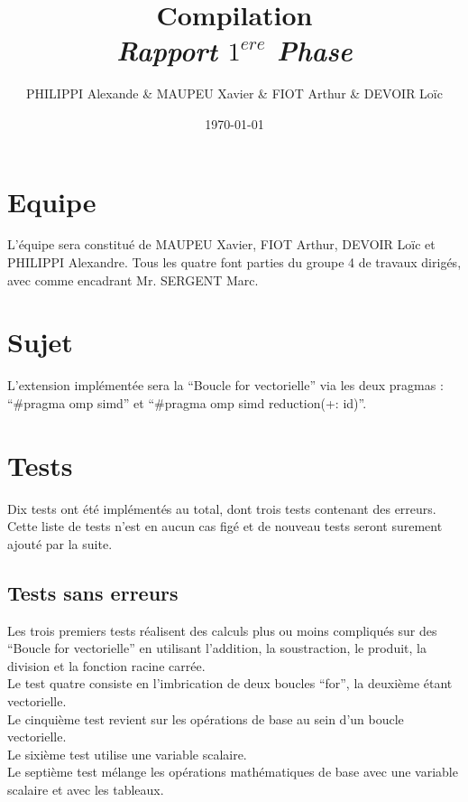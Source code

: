 \documentclass[a4paper,8pt,french,fleqn]{report}
\title{\textbf{Compilation}\\\textit{Rapport $1^{ere}$ Phase}}
\author{PHILIPPI Alexande \& MAUPEU Xavier \& FIOT Arthur \& DEVOIR Loïc}
\date{\today}
\begin{document}
\maketitle

\newpage

\section*{Equipe}

L'équipe sera constitué de MAUPEU Xavier, FIOT Arthur, DEVOIR Loïc et PHILIPPI Alexandre. Tous les quatre font parties du groupe 4 de travaux dirigés, avec comme encadrant Mr. SERGENT Marc.

\section*{Sujet}

L'extension implémentée sera la ``Boucle for vectorielle'' via les deux pragmas : ``\#pragma omp simd'' et ``\#pragma omp simd reduction(+: id)''.

\section*{Tests}

Dix tests ont été implémentés au total, dont trois tests contenant des erreurs. Cette liste de tests n'est en aucun cas figé et de nouveau tests seront surement ajouté par la suite.

\subsection*{Tests sans erreurs}

Les trois premiers tests réalisent des calculs plus ou moins compliqués sur des ``Boucle for vectorielle'' en utilisant l'addition, la soustraction, le produit, la division et la fonction racine carrée. \\

Le test quatre consiste en l'imbrication de deux boucles ``for'', la deuxième étant vectorielle. \\

Le cinquième test revient sur les opérations de base au sein d'un boucle vectorielle. \\

Le sixième test utilise une variable scalaire. \\

Le septième test mélange les opérations mathématiques de base avec une variable scalaire et avec les tableaux. \\
\end{document}
